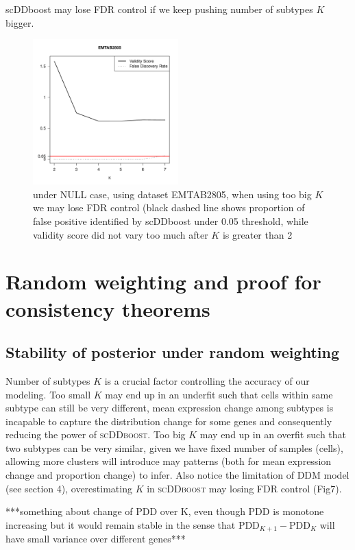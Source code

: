 \documentclass[aoas,preprint]{imsart}
\begin{document}
scDDboost may lose FDR control if we keep pushing number of subtypes $K$ bigger.
\begin{figure}[h!]
\includegraphics[width = 0.5\textwidth]{Figs/breakFDR.pdf}
 \caption{under NULL case, using dataset EMTAB2805, when using too big $K$ we may lose FDR control (black dashed line shows proportion of false positive identified by scDDboost under 0.05 threshold, while validity score did not vary too much after $K$ is
 greater than 2 }
  \label{fig:7}
\end{figure}




\section{Random weighting and proof for consistency theorems}


\subsection{Stability of posterior under random weighting}

Number of subtypes $K$ is a crucial factor controlling the accuracy of our modeling. 
Too small $K$ may end up in an underfit such that cells within same subtype can still be very different,
mean expression change among subtypes is incapable to capture the distribution change for some genes and consequently reducing the power of \textsc{scDDboost}.
Too big $K$ may end up in an overfit such that two subtypes can be very similar, given we have fixed number of samples (cells), allowing more clusters will introduce may patterns (both for mean expression change and proportion change) to infer. Also notice the limitation of DDM model (see section 4), overestimating $K$ in \textsc{scDDboost} may losing FDR control (Fig7).

***something about change of PDD over K, even though PDD is monotone increasing but it would remain stable in the sense that $\text{PDD}_{K+1} - \text{PDD}_K$ will have small variance over different genes***
\end{document}
